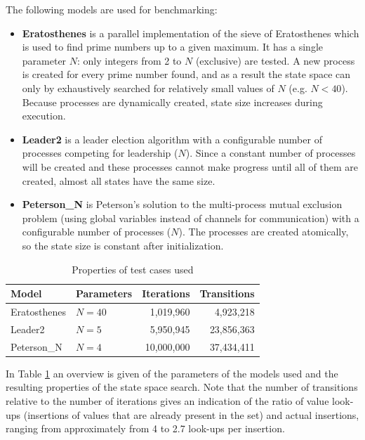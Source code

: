 \documentclass{acm_proc_article-sp}
\begin{document}
The following models are used for benchmarking:
\begin{itemize}
\item\textbf{Eratosthenes} is a parallel implementation of the sieve
of Eratosthenes which is used to find prime numbers up to a given maximum.
It has a single parameter $N$: only integers from 2 to $N$ (exclusive) are
tested. A new process is created for every prime number found, and as a result
the state space can only by exhaustively searched for relatively small values
of $N$ (e.g. $N < 40$). Because processes are dynamically created, state size
increases during execution.

\item\textbf{Leader2} is a leader election algorithm with a configurable number
of processes competing for leadership ($N$). Since a constant number of
processes will be created and these processes cannot make progress until all
of them are created, almost all states have the same size.

\item\textbf{Peterson\_N} is Peterson's solution to the multi-process mutual
exclusion problem (using global variables instead of channels for
communication) with a configurable number of processes ($N$). The processes
are created atomically, so the state size is constant after initialization.
\end{itemize}

\begin{table}
\begin{center}
\begin{tabular}{ l l r r }
\hline
\textbf{Model} & \textbf{Parameters} & \textbf{Iterations} & \textbf{Transitions} \\
\hline
Eratosthenes & $N=40$ &  1,019,960 &  4,923,218 \\
Leader2      & $N=5$  &  5,950,945 & 23,856,363 \\
Peterson\_N  & $N=4$  & 10,000,000 & 37,434,411 \\
\hline
\end{tabular}
\caption{Properties of test cases used}
\label{tab-cases}
\end{center}
\end{table}


In Table \ref{tab-cases} an overview is given of the parameters of the models used
and the resulting properties of the state space search.
Note that the number of transitions relative to the number of iterations gives an
indication of the ratio of value look-ups (insertions of values that are already
present in the set) and actual insertions, ranging from approximately from 4 to
2.7 look-ups per insertion.
\end{document}
